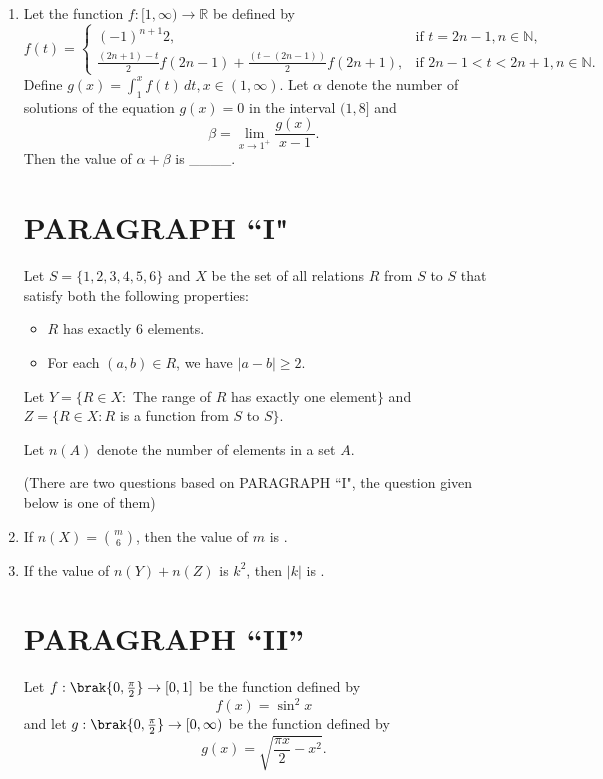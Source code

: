 \documentclass[12pt,a4paper]{article}
\begin{document}
\begin{enumerate}
    \item Let the function $ f : [1, \infty) \to \mathbb{R} $ be defined by  
\[
    f(t) =
    \begin{cases} 
    (-1)^{n+1} 2, & \text{if } t = 2n - 1, n \in \mathbb{N}, \\ 
    \frac{(2n+1)-t}{2} f(2n-1) + \frac{(t - (2n-1))}{2} f(2n+1), & \text{if } 2n - 1 < t < 2n + 1, n \in \mathbb{N}.
    \end{cases}
\]
    Define $ g(x) = \int_1^x f(t) \, dt, x \in (1, \infty) $. Let $ \alpha $ denote the number of solutions of the equation $ g(x) = 0 $ in the interval $ (1,8] $ and  
\[
    \beta = \lim\limits_{x \to 1^+} \frac{g(x)}{x-1}.
\]
    Then the value of $ \alpha + \beta $ is \_\_\_\_.


\section*{PARAGRAPH ``I"}

Let $S = \{1,2,3,4,5,6\}$ and $X$ be the set of all relations $R$ from $S$ to $S$ that satisfy both the following properties:

\begin{itemize}
    \item $R$ has exactly 6 elements.
    \item For each $(a,b) \in R$, we have $|a - b| \geq 2$.
\end{itemize}

Let $Y = \{ R \in X :$ The range of $R$ has exactly one element$\}$ and  
$Z = \{ R \in X : R$ is a function from $S$ to $S\}$.  

Let $n(A)$ denote the number of elements in a set $A$.

(There are two questions based on PARAGRAPH ``I", the question given below is one of them)

\item If $n(X) = \binom{m}{6}$, then the value of $m$ is \underline{\hspace{1cm}}.

\item If the value of $n(Y) + n(Z)$ is $k^2$, then $|k|$ is \underline{\hspace{1cm}}.
\section*{PARAGRAPH ``II''}

Let $ f: \brak{ 0, \frac{\pi}{2} } \to [0,1] $ be the function defined by  
\[
f(x) = \sin^2 x
\]
and let $ g: \brak{ 0, \frac{\pi}{2} } \to [0, \infty) $ be the function defined by  
\[
g(x) = \sqrt{\frac{\pi x}{2} - x^2}.
\]


\end{enumerate}
\end{document}
